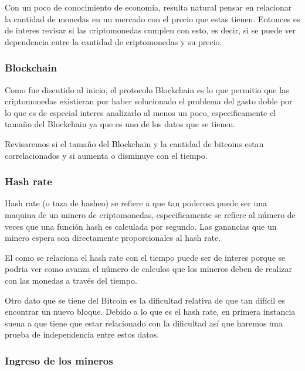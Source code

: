 \documentclass[12pt,letterpaper]{article}
\begin{document}
    Con un poco de conocimiento de economía, resulta natural pensar en relacionar la cantidad de monedas en un mercado con el precio que estas tienen. Entonces es de interes revisar si las criptomonedas cumplen con esto, es decir, si se puede ver dependencia entre la cantidad de criptomonedas y su precio.


    \subsubsection*{Blockchain}

    Como fue discutido al inicio, el protocolo Blockchain es lo que permitio que las criptomonedas existieran por haber solucionado el problema del gasto doble por lo que es de especial interes analizarlo al menos un poco, especificamente el tamaño del Blockchain ya que es uno de los datos que se tienen.

    Revisaremos si el tamaño del Blockchain y la cantidad de bitcoins estan correlacionados y si aumenta o disminuye con el tiempo.


    \subsubsection*{Hash rate}

    Hash rate (o taza de hasheo) se refiere a que tan poderosa puede ser una maquina de un minero de criptomonedas, especificamente se refiere al número de veces que una función hash es calculada por segundo. Las ganancias que un minero espera son directamente proporcionales al hash rate.

    El como se relaciona el hash rate con el tiempo puede ser de interes porque se podria ver como avanza el número de calculos que los mineros deben de realizar con las monedas a través del tiempo.



   Otro dato que se tiene del Bitcoin es la dificultad relativa de que tan difícil es encontrar un nuevo bloque. Debido a lo que es el hash rate, en primera instancia suena a que tiene que estar relacionado con la dificultad así que haremos una prueba de independencia entre estos datos. 

   \subsubsection*{Ingreso de los mineros}
\end{document}
